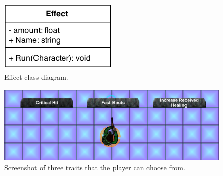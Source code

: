 \pagebreak

\begin{figure}[H]
\centering
\includegraphics[width=0.5\textwidth]{figures/traits/EffectClassDiagram.png}
\caption{Effect class diagram.}
\label{traits:effectclassdiagram}
\end{figure}


\begin{figure}[H]
\centering
\includegraphics[scale=0.3]{figures/traits/Traits.png}
\caption{Screenshot of three traits that the player can choose from.}
\label{traits:traitselection:traits}
\end{figure}